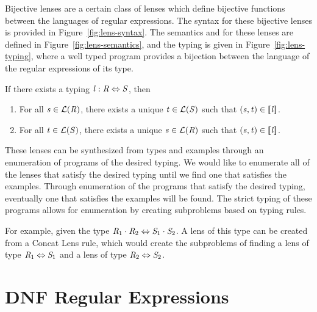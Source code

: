 \documentclass[numbers]{sigplanconf}
\begin{document}
Bijective lenses are a certain class of lenses which define bijective functions
between the languages of regular expressions.
The syntax for these bijective lenses is provided in Figure~\ref{fig:lens-syntax}.
The semantics and for these lenses are defined in Figure~\ref{fig:lens-semantics},
and the typing is given in Figure~\ref{fig:lens-typing}, where a well
typed program provides a bijection between the language of the regular expressions
of its type.

\begin{theorem}
  If there exists a typing $\mathit{l}:\mathit{R}\Leftrightarrow\mathit{S}$, then
  \begin{enumerate}
    \item
      For all $\mathit{s}\in\mathcal{L}(\mathit{R})$, there exists a unique
      $\mathit{t}\in\mathcal{L}(\mathit{S})$ such that
      $(\mathit{s},\mathit{t})\in[ \! [\mathit{l}] \! ]$.
    \item
      For all $\mathit{t}\in\mathcal{L}(\mathit{S})$, there exists a unique
      $\mathit{s}\in\mathcal{L}(\mathit{R})$ such that
      $(\mathit{s},\mathit{t})\in[ \! [\mathit{l}] \! ]$.
  \end{enumerate}
\end{theorem}
These lenses can be synthesized from types and examples through an enumeration
of programs of the desired typing.
We would like to enumerate all of the lenses that satisfy the desired typing
until we find one that satisfies the examples.
Through enumeration of the programs that satisfy the desired typing, eventually
one that satisfies the examples will be found.
The strict typing of these programs allows for enumeration by creating
subproblems based on typing rules.

For example, given the type $\mathit{R}_1\cdot\mathit{R}_2\Leftrightarrow\mathit{S}_1\cdot\mathit{S}_2$.
A lens of this type can be created from a Concat Lens rule,
which would create the subproblems of finding a lens of type $\mathit{R}_1\Leftrightarrow\mathit{S}_1$
and a lens of type $\mathit{R}_2\Leftrightarrow\mathit{S}_2$.

\section{DNF Regular Expressions}
\end{document}

